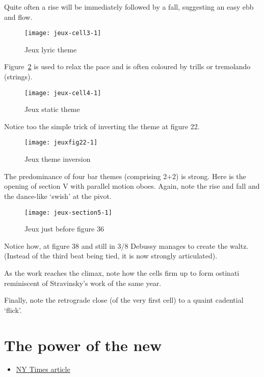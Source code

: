 Quite often a rise will be immediately followed by a fall, suggesting an easy ebb and flow.

\begin{figure}[H]
\centering
\texttt{[image: jeux-cell3-1]}\caption{Jeux lyric theme}
\label{fig:jeux3}
\end{figure}

Figure~\ref{fig:jeux4} is used to relax the pace and is often coloured by trills or tremolando (strings).

\begin{figure}[H]
\centering
\texttt{[image: jeux-cell4-1]}\caption{Jeux static theme}
\label{fig:jeux4}
\end{figure}

Notice too the simple trick of inverting the theme at figure 22. 

\begin{figure}[H]
\centering
\texttt{[image: jeuxfig22-1]}\caption{Jeux theme inversion}
\label{fig:jeuxthemeinvert}
\end{figure}

The predominance of four bar themes (comprising 2+2) is strong. Here is the opening of section V with parallel motion oboes. Again, note the rise and fall and the dance-like `swish' at the pivot. 

\begin{figure}[H]
\centering
\texttt{[image: jeux-section5-1]}\caption{Jeux just before figure 36}
\label{fig:jeuxoboe}
\end{figure}

Notice how, at figure 38 and still in 3/8 Debussy manages to create the waltz. (Instead of the third beat being tied, it is now strongly articulated).    

As the work reaches the climax, note how the cells firm up to form ostinati reminiscent of Stravinsky's work of the same year. 

Finally, note the retrograde close (of the very first cell) to a quaint cadential `flick'. 


\section{The power of the new}
\begin{itemize}
\item \href{http://www.nytimes.com/2012/09/19/arts/music/radical-music-sometimes-shocking-sometimes-subtle.html?pagewanted=all&_r=0}{NY Times article}
\end{itemize}

